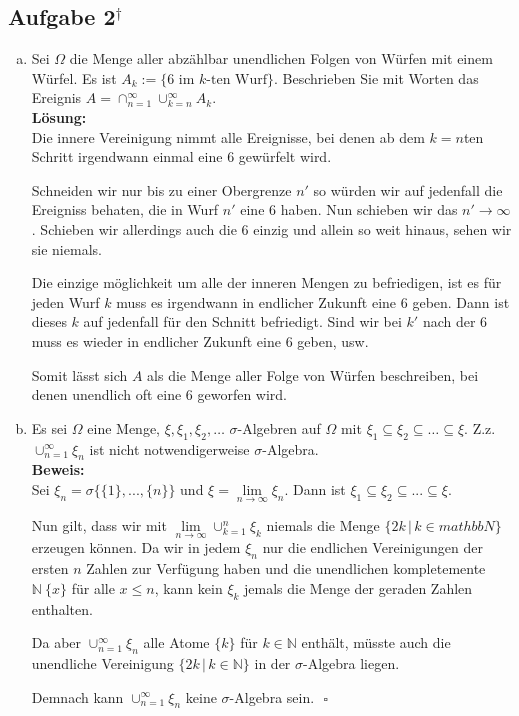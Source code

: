\documentclass[11pt,a4paper,ngerman]{article}
\newcommand{\set}[1]{ \{ #1 \}}
\begin{document}
\subsection*{Aufgabe 2$^\dagger$}
\begin{enumerate}[a)]
\item Sei $\Omega$ die Menge aller abzählbar unendlichen Folgen von Würfen mit einem Würfel. Es ist $A_k := \set{\text{6 im $k$-ten Wurf}}$. Beschrieben
Sie mit Worten das Ereignis $A = \cap_{n=1}^\infty \cup_{k=n}^\infty A_k$.\\

\textbf{Lösung:}\\

Die innere Vereinigung nimmt alle Ereignisse, bei denen ab dem $k=n$ten
Schritt irgendwann einmal eine $6$ gewürfelt wird.

Schneiden wir nur bis zu einer Obergrenze $n'$ so würden wir auf jedenfall
die Ereigniss behaten, die in Wurf $n'$ eine $6$ haben. Nun schieben
wir das $n' \rightarrow \infty$. Schieben wir allerdings auch die $6$ einzig und
allein so weit hinaus, sehen wir sie niemals.

Die einzige möglichkeit um alle der inneren Mengen zu befriedigen, ist
es für jeden Wurf $k$ muss es irgendwann in endlicher Zukunft eine $6$ geben.
Dann ist dieses $k$ auf jedenfall für den Schnitt befriedigt. Sind wir bei $k'$ nach der $6$ muss es wieder in endlicher Zukunft eine $6$ geben, usw.

Somit lässt sich $A$ als die Menge aller Folge von Würfen beschreiben, bei denen
unendlich oft eine $6$ geworfen wird.

\item Es sei $\Omega$ eine Menge, $\xi, \xi_1, \xi_2,\ldots$ $\sigma$-Algebren auf $\Omega$ mit $\xi_1 \subseteq \xi_2 \subseteq \ldots \subseteq \xi$.
Z.z. $\cup_{n=1}^\infty \xi_n$ ist nicht notwendigerweise $\sigma$-Algebra.\\

\textbf{Beweis:}\\

Sei $\xi_n = \sigma \{ \{1\} , ... , \{n\}\}$ und $\xi = \underset{n\rightarrow \infty}{\lim} \xi_n$.
Dann ist $\xi_1 \subseteq \xi_2 \subseteq ... \subseteq \xi$.

Nun gilt, dass wir mit $\underset{n\rightarrow\infty}{\lim}\cup_{k=1}^n \xi_k$
niemals die Menge $\{2k \, | \, k \in mathbb{N}\}$ erzeugen können.
Da wir in jedem $\xi_n$ nur die endlichen Vereinigungen der ersten $n$ Zahlen
zur Verfügung haben und die unendlichen kompletemente $\mathbb{N} \ \{x\}$ für alle $x \leq n$, kann kein $\xi_k$ jemals die Menge der geraden Zahlen enthalten.

Da aber $\cup_{n=1}^\infty \xi_n$ alle Atome $\{k\}$ für $k\in \mathbb{N}$ 
enthält, müsste auch die unendliche Vereinigung $\{2k \, | \, k \in \mathbb{N}\}$ in der $\sigma$-Algebra liegen.

Demnach kann $\cup_{n=1}^\infty \xi_n$ keine $\sigma$-Algebra sein.
 $\mbox{}$ \hfill $\square$

\end{enumerate}
\end{document}
